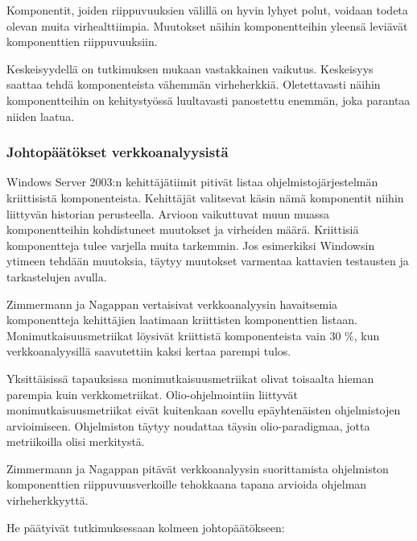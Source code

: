 \documentclass[finnish]{../tktltiki2}
\theoremstyle{definition}
\theoremstyle{remark}
\begin{document}
\begin{enumerate}
    Komponentit, joiden riippuvuuksien välillä on hyvin lyhyet polut, voidaan todeta olevan muita virhealttiimpia. 
    Muutokset näihin komponentteihin yleensä leviävät komponenttien riippuvuuksiin.
    
    Keskeisyydellä on tutkimuksen mukaan vastakkainen vaikutus. Keskeisyys saattaa tehdä komponenteista vähemmän 
    virheherkkiä. Oletettavasti näihin komponentteihin on kehitystyössä luultavasti panostettu enemmän, joka parantaa 
    niiden laatua.
    
\end{enumerate}

\subsubsection{Johtopäätökset verkkoanalyysistä}

Windows Server 2003:n kehittäjätiimit pitivät listaa ohjelmistojärjestelmän kriittisistä komponenteista. Kehittäjät 
valitsevat käsin nämä komponentit niihin liittyvän historian perusteella. Arvioon vaikuttuvat muun muassa 
komponentteihin kohdistuneet muutokset ja virheiden määrä. Kriittisiä komponentteja tulee varjella muita tarkemmin. 
Jos esimerkiksi Windowsin ytimeen tehdään muutoksia, täytyy muutokset varmentaa kattavien testausten ja tarkastelujen 
avulla.

    Zimmermann ja Nagappan vertaisivat verkkoanalyysin havaitsemia komponentteja kehittäjien laatimaan kriittisten 
komponenttien listaan. Monimutkaisuusmetriikat löysivät kriittistä komponenteista vain 30 \%, kun verkkoanalyysillä 
saavutettiin kaksi kertaa parempi tulos.

    Yksittäisissä tapauksissa monimutkaisuusmetriikat olivat toisaalta hieman parempia kuin verkkometriikat. 
Olio-ohjelmointiin liittyvät monimutkaisuusmetriikat eivät kuitenkaan sovellu epäyhtenäisten ohjelmistojen arvioimiseen. 
Ohjelmiston täytyy noudattaa täysin olio-paradigmaa, jotta metriikoilla olisi merkitystä.

    Zimmermann ja Nagappan pitävät verkkoanalyysin suorittamista ohjelmiston komponenttien riippuvuusverkoille 
tehokkaana tapana arvioida ohjelman virheherkkyyttä.\newline

\newpage

\noindent He päätyivät tutkimuksessaan kolmeen johtopäätökseen:
\end{document}
